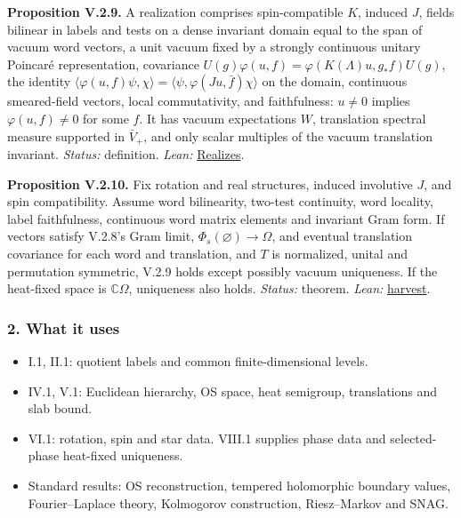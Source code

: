 \documentclass[
  letterpaper,
  11pt]{article}
\providecommand{\tightlist}{%
  \setlength{\itemsep}{0pt}\setlength{\parskip}{0pt}}
\begin{document}
\textbf{Proposition V.2.9.} A realization comprises spin-compatible
\(K\), induced \(J\), fields bilinear in labels and tests on a dense
invariant domain equal to the span of vacuum word vectors, a unit vacuum
fixed by a strongly continuous unitary Poincaré representation,
covariance \(U(g)\varphi(u,f)=\varphi(K(\Lambda)u,g_*f)U(g)\), the
identity
\(\langle\varphi(u,f)\psi,\chi\rangle=\langle\psi,\varphi(Ju,\bar f)\chi\rangle\)
on the domain, continuous smeared-field vectors, local commutativity,
and faithfulness: \(u\ne0\) implies \(\varphi(u,f)\ne0\) for some \(f\).
It has vacuum expectations \(W\), translation spectral measure supported
in \(\bar V_+\), and only scalar multiples of the vacuum translation
invariant. \emph{Status:} definition. \emph{Lean:}
\href{https://github.com/yang-mills-group/OpenAI-YM-20261028/blob/3456e5e75cf8d4cd558955a5c7638fba2d68f464/YM/Fields/System.lean\#L124-L135}{Realizes}.

\textbf{Proposition V.2.10.} Fix rotation and real structures, induced
involutive \(J\), and spin compatibility. Assume word bilinearity,
two-test continuity, word locality, label faithfulness, continuous word
matrix elements and invariant Gram form. If vectors satisfy V.2.8's Gram
limit, \(\Phi_s(\varnothing)\to\Omega\), and eventual translation
covariance for each word and translation, and \(T\) is normalized,
unital and permutation symmetric, V.2.9 holds except possibly vacuum
uniqueness. If the heat-fixed space is \(\mathbb C\Omega\), uniqueness
also holds. \emph{Status:} theorem. \emph{Lean:}
\href{https://github.com/yang-mills-group/OpenAI-YM-20261028/blob/3456e5e75cf8d4cd558955a5c7638fba2d68f464/YM/Fields/Lo.lean\#L85-L95}{harvest}.

\subsubsection{2. What it uses}\label{what-it-uses-21}

\begin{itemize}
\tightlist
\item
  I.1, II.1: quotient labels and common finite-dimensional levels.
\item
  IV.1, V.1: Euclidean hierarchy, OS space, heat semigroup, translations
  and slab bound.
\item
  VI.1: rotation, spin and star data. VIII.1 supplies phase data and
  selected-phase heat-fixed uniqueness.
\item
  Standard results: OS reconstruction, tempered holomorphic boundary
  values, Fourier--Laplace theory, Kolmogorov construction,
  Riesz--Markov and SNAG.
\end{itemize}
\end{document}
